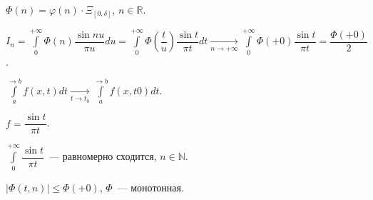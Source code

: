 \documentclass{article}
\begin{document}
            $\Phi(n) = \varphi(n) \cdot \Xi_{[0, \delta]}$, $n \in \mathbb{R}$.
            
            $I_n = \int\limits^{+\infty}_0 \Phi(n) \dfrac{\sin nu}{\pi u} du = \int\limits^{+\infty}_0 \Phi \left( \dfrac{t}{u} \right) \dfrac{\sin t}{\pi t} dt \xrightarrow[n \rightarrow +\infty]{} \int\limits^{+\infty}_0 \Phi(+0) \dfrac{\sin t}{\pi t} = \dfrac{\Phi(+0)}{2}$.
            
            $\int\limits^{\rightarrow b}_a f(x, t) dt \xrightarrow[t \rightarrow t_0]{} \int\limits^{\rightarrow b}_a f(x, t0) dt$.
            
            $f = \dfrac{\sin t}{\pi t}$.
            
            $\int\limits^{+\infty}_0 \dfrac{\sin t}{\pi t}$~--- равномерно сходится, $n \in \mathbb{N}$.
            
            $\left| \Phi(t, n) \right| \leqslant \Phi(+ 0)$, $\Phi$~--- монотонная.
            
\end{document}
